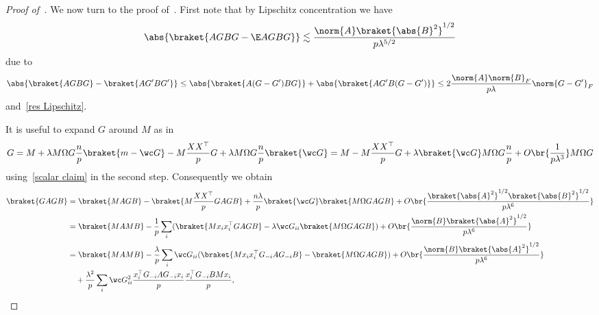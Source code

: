 \begin{proof}[Proof of~]
    We now turn to the proof of~. First note that by Lipschitz concentration we have
    \begin{equation}\label{AGBG lipschitz}
        \abs{\braket{AGBG-\E AGBG}} \lesssim \frac{\norm{A}\braket{\abs{B}^2}^{1/2}}{p\lambda^{5/2}}
    \end{equation}
    due to
    \begin{equation}
        \abs{\braket{A G B G}- \braket{AG' B G' } }\le \abs{\braket{A (G-G')BG}} + \abs{\braket{AG'B(G-G')}} \le 2\frac{\norm{A}\norm{B}_F}{p\lambda} \norm{G-G'}_F
    \end{equation}
    and~\cref{res Lipschitz}.

    It is useful to expand $G$ around $M$ as in
    \begin{equation}
        \begin{split}
            G= M+\lambda M \Omega G\frac{n}{p}\braket{m-\wc G} -  M\frac{XX^\top}{p}G+ \lambda M\Omega G \frac{n}{p}\braket{\wc G} = M-  M\frac{XX^\top}{p}G+ \lambda \braket{\wc G} M\Omega G \frac{n}{p} + O\br{ \frac{1}{p\lambda^3} } M\Omega G
        \end{split}
    \end{equation}
    using~\cref{scalar claim} in the second step. Consequently we obtain
    \begin{equation}\label{GAGB exp}
        \begin{split}
            \braket{GAGB} &= \braket{MAGB} - \braket{M\frac{XX^\top}{p}G AGB} + \frac{n\lambda}{p}\braket{\wc G} \braket{M\Omega G AGB} + O\br{\frac{\braket{\abs{A}^2}^{1/2}\braket{\abs{B}^2}^{1/2}}{p \lambda^6}}\\
            & =\braket{MAMB} -\frac{1}{p} \sum_i (\braket{M x_i x_i^\top G AG B}-\lambda\wc G_{ii}\braket{M\Omega GAGB})  + O\br{\frac{\norm{B}\braket{\abs{A}^2}^{1/2}}{p\lambda^6}} \\
            & = \braket{MAMB} -\frac{\lambda}{p} \sum_i \wc G_{ii} (\braket{M x_i x_i^\top G_{-i} AG_{-i} B}-\braket{M\Omega GAGB})  + O\br{\frac{\norm{B}\braket{\abs{A}^2}^{1/2}}{p\lambda^6}}\\
            &\quad + \frac{\lambda^2}{p} \sum_i \wc G_{ii}^2 \frac{x_i^\top G_{-i} AG_{-i}x_i}{p}\frac{x_i^\top G_{-i} B M x_i}{p},
        \end{split}
    \end{equation}

\end{proof}
